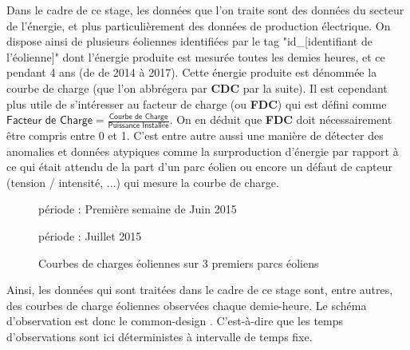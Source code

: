 
Dans le cadre de ce stage, les données que l'on traite sont des données du secteur de l'énergie, et plus particulièrement des données de production électrique. On dispose ainsi de plusieurs éoliennes identifiées par le tag "id\_[identifiant de l'éolienne]" dont l'énergie produite est mesurée toutes les demies heures, et ce pendant 4 ans (de de 2014 à 2017).
Cette énergie produite est dénommée la courbe de charge (que l'on abbrégera par \textbf{CDC} par la suite). Il est cependant plus utile de s'intéresser au facteur de charge (ou \textbf{FDC}) qui est défini comme
$\displaystyle\textsf{Facteur de Charge} = \frac{\textsf{Courbe de Charge}}{\textsf{Puissance Installée}}$.
On en déduit que \textbf{FDC} doit nécessairement être compris entre 0 et 1. C'est entre autre aussi une manière de détecter des anomalies et données atypiques comme la surproduction d'énergie par rapport à ce qui était attendu de la part d'un parc éolien ou encore un défaut de capteur (tension / intensité, ...) qui mesure la courbe de charge.


\begin{figure}[H]
	\centering
	période : Première semaine de Juin 2015


	période : Juillet 2015

	\caption{Courbes de charges éoliennes sur 3 premiers parcs éoliens}
	\label{fig:courbes_de_charge}
\end{figure}

\bigskip

Ainsi, les données qui sont traitées dans le cadre de ce stage sont, entre autres, des courbes de charge éoliennes observées chaque demie-heure. Le schéma d’observation est donc le \og common-design \fg. C'est-à-dire que les temps d'observations sont ici déterministes à intervalle de temps fixe.
